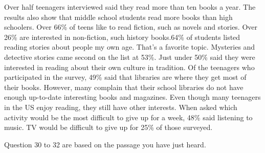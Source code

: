\documentclass[12pt]{article}
\begin{document}
\vspace{0.00mm}
\setlength{\parindent}{0.00mm}
\setlength{\leftskip}{-6.23mm}
\setlength{\rightskip}{0.00mm}


\vspace{0.00mm}

\vspace{0.00mm}
\setlength{\parindent}{0.00mm}
\setlength{\leftskip}{-6.23mm}
\setlength{\rightskip}{0.00mm}

Over half teenagers interviewed said they read more than ten books a year. The results also show that middle school students read more books than high schoolers. Over 66\% of teens like to read fiction, such as novels and stories. Over 26\% are interested in non-fiction, such history books.64\% of students listed reading stories about people my own age. That's a favorite topic. Mysteries and detective stories came second on the list at 53\%. Just under 50\% said they were interested in reading about their own culture in tradition. Of the teenagers who participated in the survey, 49\% said that libraries are where they get most of their books. However, many complain that their school libraries do not have enough up-to-date interesting books and magazines. Even though many teenagers in the US enjoy reading, they still have other interests. When asked which activity would be the most difficult to give up for a week, 48\% said listening to music. TV would be difficult to give up for 25\% of those surveyed.
\vspace{0.00mm}

\vspace{0.00mm}
\setlength{\parindent}{0.00mm}
\setlength{\leftskip}{-6.23mm}
\setlength{\rightskip}{0.00mm}


\vspace{0.00mm}

\vspace{0.00mm}
\setlength{\parindent}{0.00mm}
\setlength{\leftskip}{-6.23mm}
\setlength{\rightskip}{0.00mm}

Question 30 to 32 are based on the passage you have just heard.
\vspace{0.00mm}

\vspace{0.00mm}
\setlength{\parindent}{0.00mm}
\setlength{\leftskip}{-6.23mm}
\setlength{\rightskip}{0.00mm}


\vspace{0.00mm}

\vspace{0.00mm}
\setlength{\parindent}{0.00mm}
\setlength{\leftskip}{-6.23mm}
\setlength{\rightskip}{0.00mm}
\end{document}
